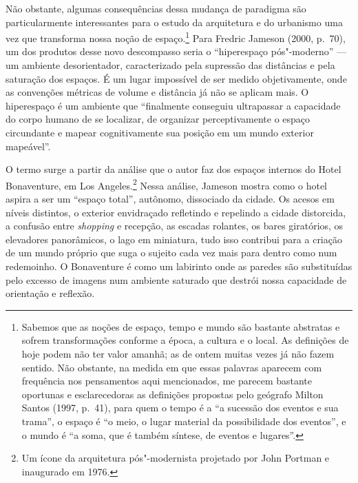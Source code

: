 Não obstante, algumas consequências dessa mudança de paradigma são
particularmente interessantes para o estudo da arquitetura e do
urbanismo uma vez que transforma nossa noção de espaço.\footnote{Sabemos
  que as noções de espaço, tempo e mundo são bastante abstratas e sofrem
  transformações conforme a época, a cultura e o local. As definições de
  hoje podem não ter valor amanhã; as de ontem muitas vezes já não fazem
  sentido. Não obstante, na medida em que essas palavras aparecem com
  frequência nos pensamentos aqui mencionados, me parecem bastante
  oportunas e esclarecedoras as definições propostas pelo geógrafo
  Milton Santos (1997, p.~41), para quem o tempo é a ``a sucessão dos
  eventos e sua trama'', o espaço é ``o meio, o lugar material da
  possibilidade dos eventos'', e o mundo é ``a soma, que é também
  síntese, de eventos e lugares''.} Para Fredric Jameson (2000, p.~70), um dos
produtos desse novo descompasso seria o ``hiperespaço pós"-moderno'' ---
um ambiente desorientador, caracterizado pela supressão das distâncias e
pela saturação dos espaços. É um lugar impossível de ser medido
objetivamente, onde as convenções métricas de volume e distância já não
se aplicam mais. O hiperespaço é um ambiente que ``finalmente conseguiu
ultrapassar a capacidade do corpo humano de se localizar, de organizar
perceptivamente o espaço circundante e mapear cognitivamente sua posição
em um mundo exterior mapeável''.

O termo surge a partir da análise que o autor faz dos espaços internos
do Hotel Bonaventure, em Los Angeles.\footnote{Um ícone da arquitetura
  pós"-modernista projetado por John Portman e inaugurado em 1976.} Nessa
análise, Jameson mostra como o hotel aspira a ser um ``espaço total'',
autônomo, dissociado da cidade. Os acesos em níveis distintos, o
exterior envidraçado refletindo e repelindo a cidade distorcida, a
confusão entre \emph{shopping} e recepção, as escadas rolantes, os bares
giratórios, os elevadores panorâmicos, o lago em miniatura, tudo isso
contribui para a criação de um mundo próprio que suga o sujeito cada vez
mais para dentro como num redemoinho. O Bonaventure é como um labirinto
onde as paredes são substituídas pelo excesso de imagens num ambiente
saturado que destrói nossa capacidade de orientação e reflexão.


